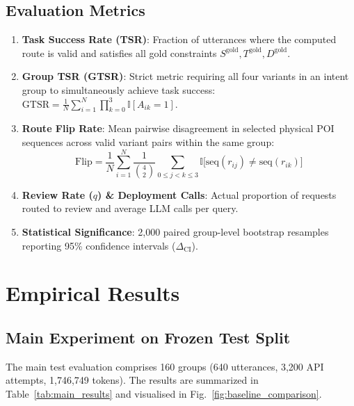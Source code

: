 \documentclass[conference]{IEEEtran}
\begin{document}
\subsection{Evaluation Metrics}
\begin{enumerate}
    \item \textbf{Task Success Rate (TSR)}: Fraction of utterances where the computed route is valid and satisfies all gold constraints $S^{\text{gold}}, T^{\text{gold}}, D^{\text{gold}}$.
    \item \textbf{Group TSR (GTSR)}: Strict metric requiring all four variants in an intent group to simultaneously achieve task success: $\text{GTSR} = \frac{1}{N} \sum_{i=1}^N \prod_{k=0}^3 \mathbb{I}[A_{ik} = 1]$.
    \item \textbf{Route Flip Rate}: Mean pairwise disagreement in selected physical POI sequences across valid variant pairs within the same group:
    \begin{equation}
    \text{Flip} = \frac{1}{N} \sum_{i=1}^N \frac{1}{\binom{4}{2}} \sum_{0 \le j < k \le 3} \mathbb{I}\big[\text{seq}(r_{ij}) \neq \text{seq}(r_{ik})\big]
    \end{equation}
    \item \textbf{Review Rate ($q$) \& Deployment Calls}: Actual proportion of requests routed to review and average LLM calls per query.
    \item \textbf{Statistical Significance}: 2,000 paired group-level bootstrap resamples reporting 95\% confidence intervals ($\Delta_{\text{CI}}$).
\end{enumerate}

\section{Empirical Results}

\subsection{Main Experiment on Frozen Test Split}
The main test evaluation comprises 160 groups (640 utterances, 3,200 API attempts, 1,746,749 tokens). The results are summarized in Table~\ref{tab:main_results} and visualised in Fig.~\ref{fig:baseline_comparison}.
\end{document}
